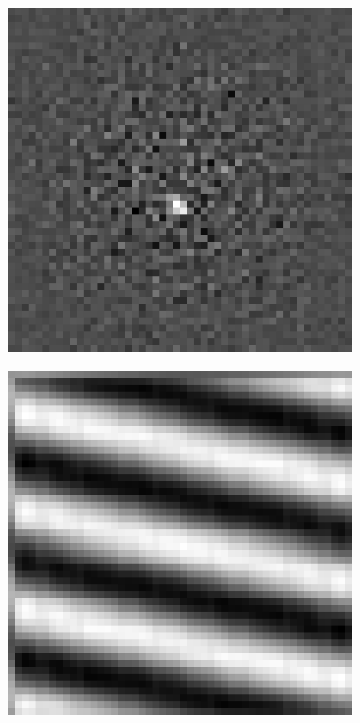 \begin{figure}[htpb]
\begin{subfigure}{.25\textwidth}
\end{subfigure}%
\begin{subfigure}{.25\textwidth}
\includegraphics[width=1\textwidth]{img/noisyPOCsigma300}
\end{subfigure}
\quad
\begin{subfigure}{.25\textwidth}
\includegraphics[width=1\textwidth]{img/CPSRank1sigma0}

\end{subfigure}
\end{figure}
